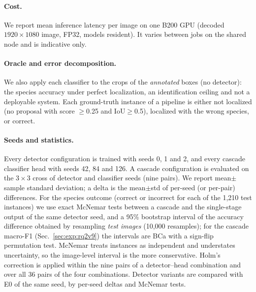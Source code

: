 \paragraph{Cost.}
We report mean inference latency per image on one B200 GPU (decoded $1920\times1080$ image, FP32, models resident). It varies between jobs on the shared node and is indicative only.

\paragraph{Oracle and error decomposition.}
We also apply each classifier to the crops of the \emph{annotated} boxes (no detector): the species accuracy under perfect localization, an identification ceiling and not a deployable system. Each ground-truth instance of a pipeline is either not localized (no proposal with score $\ge$0.25 and IoU$\ge$0.5), localized with the wrong species, or correct.

\paragraph{Seeds and statistics.}
Every detector configuration is trained with seeds 0, 1 and 2, and every cascade classifier head with seeds 42, 84 and 126. A cascade configuration is evaluated on the $3\times3$ cross of detector and classifier seeds (nine pairs). We report mean$\pm$sample standard deviation; a delta is the mean$\pm$std of per-seed (or per-pair) differences. For the species outcome (correct or incorrect for each of the 1{,}210 test instances) we use exact McNemar tests between a cascade and the single-stage output of the same detector seed, and a 95\% bootstrap interval of the accuracy difference obtained by resampling \emph{test images} (10{,}000 resamples); for the cascade macro-F1 (Sec.~\ref{sec:exp:rq2v9}) the intervals are BCa with a sign-flip permutation test. McNemar treats instances as independent and understates uncertainty, so the image-level interval is the more conservative. Holm's correction is applied within the nine pairs of a detector--head combination and over all 36 pairs of the four combinations. Detector variants are compared with E0 of the same seed, by per-seed deltas and McNemar tests.
